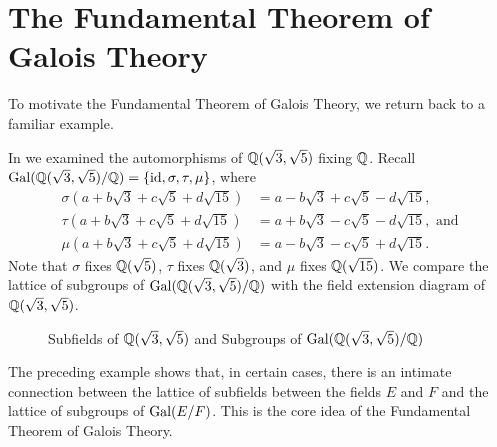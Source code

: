 \section{The Fundamental Theorem of Galois Theory}
To motivate the Fundamental Theorem of Galois Theory, we return back to a familiar example.

\begin{example}
    In  we examined the automorphisms of $\mathbb{Q}(\sqrt3, \sqrt5)$ fixing $\mathbb{Q}$. Recall $\mathrm{Gal}(\mathbb{Q}(\sqrt3,\sqrt5)/\mathbb{Q}) = \{\mathrm{id}, \sigma, \tau, \mu\}$, where
    \begin{align*}
        \sigma(a + b\sqrt3 + c\sqrt5 + d\sqrt{15}) &= a - b\sqrt3 + c\sqrt5 - d\sqrt{15},\\
        \tau(a + b\sqrt3 + c\sqrt5 + d\sqrt{15}) &= a + b\sqrt3 - c\sqrt5 - d\sqrt{15}, \text{ and}\\
        \mu(a + b\sqrt3 + c\sqrt5 + d\sqrt{15}) &= a - b\sqrt3 - c\sqrt5 + d\sqrt{15}.
    \end{align*}
    Note that $\sigma$ fixes $\mathbb{Q}(\sqrt5)$, $\tau$ fixes $\mathbb{Q}(\sqrt3)$, and $\mu$ fixes $\mathbb{Q}(\sqrt{15})$. We compare the lattice of subgroups of $\mathrm{Gal}(\mathbb{Q}(\sqrt3,\sqrt5)/\mathbb{Q})$ with the field extension diagram of $\mathbb{Q}(\sqrt3, \sqrt5)$.

    \begin{figure}[H]
        \centering
        \caption{Subfields of $\mathbb{Q}(\sqrt3,\sqrt5)$ and Subgroups of $\mathrm{Gal}(\mathbb{Q}(\sqrt3,\sqrt5)/\mathbb{Q})$}
    \end{figure}
\end{example}

The preceding example shows that, in certain cases, there is an intimate connection between the lattice of subfields between the fields $E$ and $F$ and the lattice of subgroups of $\mathrm{Gal}(E/F)$. This is the core idea of the Fundamental Theorem of Galois Theory.

\newpage

